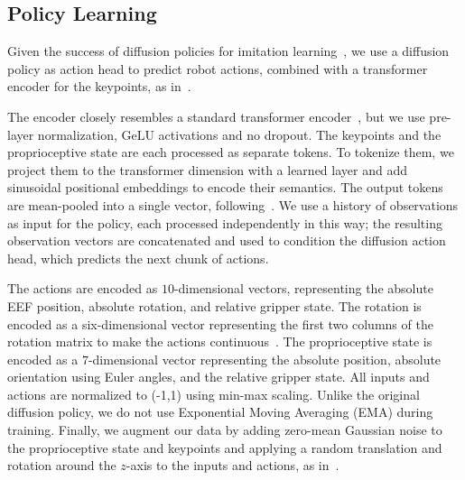 \documentclass[letterpaper, 10 pt, conference]{ieeeconf}  %
\newif\ifappendixincluded
\newcommand{\appendixnote}[1]{\ifappendixincluded#1\fi}
\newcommand{\thomas}[1]{{\color{ForestGreen} TL: #1}}
\begin{document}
\subsection{Policy Learning}
\label{sec:method-policy-learning}

Given the success of diffusion policies for imitation learning~\cite{chi2025diffusion_policy}, we use a diffusion policy as action head to predict robot actions, combined with a transformer encoder for the keypoints, as in~\cite{wang2025skil}.




The encoder closely resembles a standard transformer encoder~\cite{vaswani2017attention}, but we use pre-layer normalization, GeLU activations and no dropout.
The keypoints and the proprioceptive state are each processed as separate tokens. To tokenize them, we project them to the transformer dimension with a learned layer and add sinusoidal positional embeddings to encode their semantics. The output tokens are mean-pooled into a single vector, following~\cite{wang2025skil}. We use a history of observations as input for the policy, each processed independently in this way; the resulting observation vectors are concatenated and used to condition the diffusion action head, which predicts the next chunk of actions.


The actions are encoded as $10$-dimensional vectors, representing the absolute EEF position, absolute rotation, and relative gripper state. The rotation is encoded as a six-dimensional vector representing the first two columns of the rotation matrix to make the actions continuous~\cite{chi2025diffusion_policy}.
The proprioceptive state is encoded as a $7$-dimensional vector representing the absolute position, absolute orientation using Euler angles, and the relative gripper state.
All inputs and actions are normalized to (-1,1) using min-max scaling. Unlike the original diffusion policy, we do not use Exponential Moving Averaging (EMA) during training.
Finally, we augment our data by adding zero-mean Gaussian noise to the proprioceptive state and keypoints and applying a random translation and rotation around the $z$-axis to the inputs and actions, as in~\cite{chisari2024flow-matching-pc-IL}. \appendixnote{We report the hyperparameters for the augmentations in Appendix~\ref{sec:appendix-implementation-details-and-hyperparameters} and have evaluated the impact of the augmentations on KIL performance in Appendix~\ref{sec:appendix-additional-experiments-augmentations}.}
\end{document}
